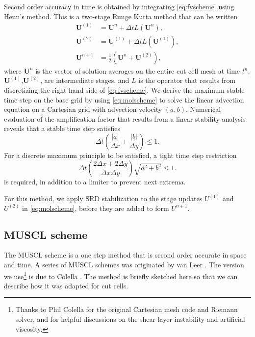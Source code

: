 Second order accuracy in time is obtained by integrating \eqref{eq:fvscheme} using Heun's method.  This is a two-stage Runge Kutta method that can be written
\begin{equation}\label{eq:molscheme}
\begin{aligned}
	\mathbf{U}^{(1)} &= \mathbf{U}^{n} + \Delta t L(\mathbf{U}^n), \\
	\mathbf{U}^{(2)} &= \mathbf{U}^{(1)} + \Delta t L(\mathbf{U}^{(1)}), \\
	\mathbf{U}^{n+1} &= \frac{1}{2}( \mathbf{U}^{n} + \mathbf{U}^{(2)} ) ,	
\end{aligned}
\end{equation}
where $\mathbf{U}^{n}$ is the vector of solution averages on the entire cut cell mesh at time $t^n$,
$\mathbf{U}^{(1)}$,$\mathbf{U}^{(2)}$, are intermediate stages, and $L$ is the operator that results
from discretizing the right-hand-side of \eqref{eq:fvscheme}.
We derive the maximum stable time step on the base grid by using \eqref{eq:molscheme} to solve the linear advection equation on a Cartesian grid with advection velocity $(a,b)$.
Numerical evaluation of the amplification factor that results from a linear stability analysis reveals that a stable time step satisfies
\begin{equation}\label{eq:vn1}
\Delta t   \left( \frac{|a|}{\Delta x} + \frac{|b|}{\Delta y} \right)\leq 1.
\end{equation}
For a discrete maximum principle to be satisfied, a tight time step restriction 
\begin{equation}
\Delta t  \left( \frac{2\Delta x + 2 \Delta y}{\Delta x \Delta y} \right) \sqrt{a^2 + b^2}\leq 1 .
\end{equation}
is required, in addition to a limiter to prevent next extrema.

For this method, we apply SRD stabilization to the stage updates
$U^{(1)}$ and $U^{(2)}$ in \eqref{eq:molscheme}, before they are added to form $U^{n+1}$.

\subsection{MUSCL scheme} \label{sec:muscl}
The MUSCL scheme is a one step method that is second order accurate in
space and time. A series of MUSCL schemes  was originated by van Leer 
\cite{vanleer:muscl}. The version we use\footnote{Thanks to Phil 
Colella for the original Cartesian mesh code and Riemann solver,  and for helpful discussions on the shear
layer instability and artificial viscosity.}
is due to Colella \cite{Colella:Unsplit}.
The method is briefly sketched here so that we can describe how it was
adapted for cut cells. 

